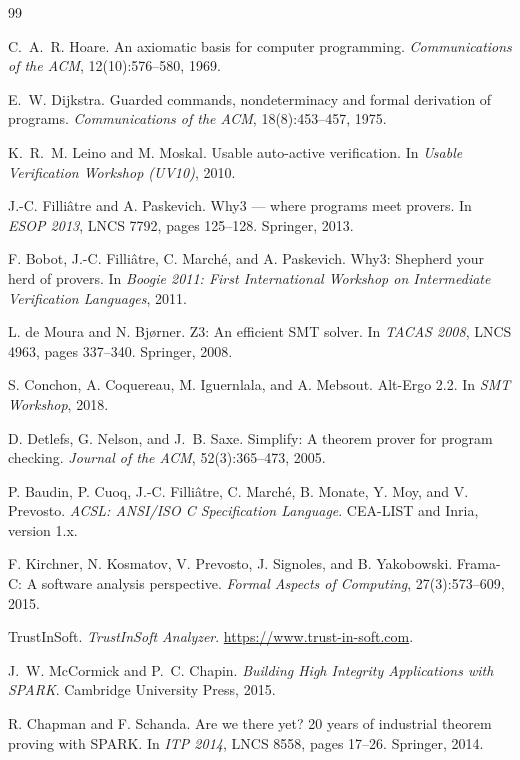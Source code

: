 \documentclass[11pt]{article}
\begin{document}
\begin{thebibliography}{99}\small

 C.~A.~R. Hoare. An axiomatic basis for computer programming.
\emph{Communications of the ACM}, 12(10):576--580, 1969.

 E.~W. Dijkstra. Guarded commands, nondeterminacy and
formal derivation of programs. \emph{Communications of the ACM},
18(8):453--457, 1975.

 K.~R.~M. Leino and M. Moskal. Usable auto-active
verification. In \emph{Usable Verification Workshop (UV10)}, 2010.

 J.-C. Filli\^atre and A. Paskevich. Why3 --- where programs
meet provers. In \emph{ESOP 2013}, LNCS 7792, pages 125--128. Springer, 2013.

 F. Bobot, J.-C. Filli\^atre, C. March\'e, and
A. Paskevich. Why3: Shepherd your herd of provers. In \emph{Boogie 2011:
First International Workshop on Intermediate Verification Languages}, 2011.

 L. de Moura and N. Bj{\o}rner. Z3: An efficient SMT solver. In
\emph{TACAS 2008}, LNCS 4963, pages 337--340. Springer, 2008.

 S. Conchon, A. Coquereau, M. Iguernlala, and A. Mebsout.
Alt-Ergo 2.2. In \emph{SMT Workshop}, 2018.

 D. Detlefs, G. Nelson, and J.~B. Saxe. Simplify: A theorem
prover for program checking. \emph{Journal of the ACM}, 52(3):365--473, 2005.

 P. Baudin, P. Cuoq, J.-C. Filli\^atre, C. March\'e, B. Monate,
Y. Moy, and V. Prevosto. \emph{ACSL: ANSI/ISO C Specification Language}.
CEA-LIST and Inria, version 1.x.

 F. Kirchner, N. Kosmatov, V. Prevosto, J. Signoles, and
B. Yakobowski. Frama-C: A software analysis perspective. \emph{Formal
Aspects of Computing}, 27(3):573--609, 2015.

 TrustInSoft. \emph{TrustInSoft Analyzer}.
\url{https://www.trust-in-soft.com}.

 J.~W. McCormick and P.~C. Chapin. \emph{Building High
Integrity Applications with SPARK}. Cambridge University Press, 2015.

 R. Chapman and F. Schanda. Are we there yet? 20 years of
industrial theorem proving with SPARK. In \emph{ITP 2014}, LNCS 8558,
pages 17--26. Springer, 2014.


\end{thebibliography}
\end{document}
